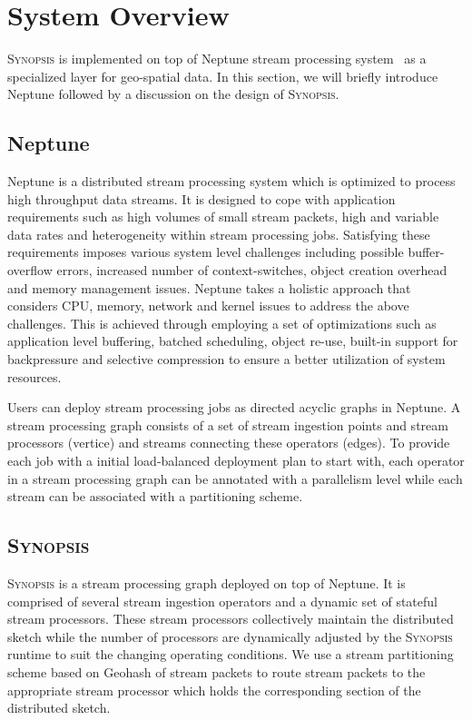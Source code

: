 \section{System Overview}
\label{sec:system}
\textsc{Synopsis} is implemented on top of Neptune stream processing system~\cite{buddhika2016neptune} as a specialized layer for geo-spatial data.
In this section, we will briefly introduce Neptune followed by a discussion on the design of \textsc{Synopsis}.

\subsection{Neptune}
Neptune is a distributed stream processing system which is optimized to process high throughput data streams.
It is designed to cope with application requirements such as high volumes of small stream packets, high and variable data rates and heterogeneity within stream processing jobs.
Satisfying these requirements imposes various system level challenges including possible buffer-overflow errors, increased number of context-switches, object creation overhead and memory management issues.
Neptune takes a holistic approach that considers CPU, memory, network and kernel issues to address the above challenges.
This is achieved through employing a set of optimizations such as application level buffering, batched scheduling, object re-use, built-in support for backpressure and selective compression to ensure a better utilization of system resources.

Users can deploy stream processing jobs as directed acyclic graphs in Neptune.
A stream processing graph consists of a set of stream ingestion points and stream processors (vertice) and streams connecting these operators (edges).
To provide each job with a initial load-balanced deployment plan to start with, each operator in a stream processing graph can be annotated with a parallelism level while each stream can be associated with a partitioning scheme.

\subsection{\textsc{Synopsis}}
\textsc{Synopsis} is a stream processing graph deployed on top of Neptune.
It is comprised of several stream ingestion operators and a dynamic set of stateful stream processors.
These stream processors collectively maintain the distributed sketch while the number of processors are dynamically adjusted by the \textsc{Synopsis} runtime to suit the changing operating conditions.
We use a stream partitioning scheme based on Geohash of stream packets to route stream packets to the appropriate stream processor which holds the corresponding section of the distributed sketch.

